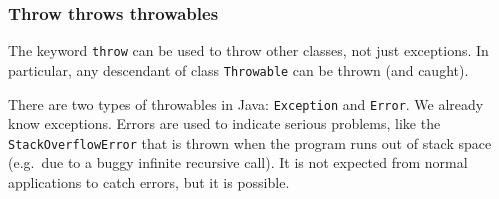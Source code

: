 \subsubsection{Throw throws throwables}
\label{sec:throw-throws-throw}

The keyword \verb+throw+ can be used to throw other classes, not just
exceptions. In particular, any descendant of class \verb+Throwable+
can be thrown (and caught). 

There are two types of throwables in Java: \verb+Exception+ and
\verb+Error+. We already know exceptions. Errors are used to indicate
serious problems, like the \verb+StackOverflowError+ that is thrown
when the program runs out of stack space (e.g.~due to a buggy infinite
recursive call). It is not expected from normal applications to catch
errors, but it is possible. 








